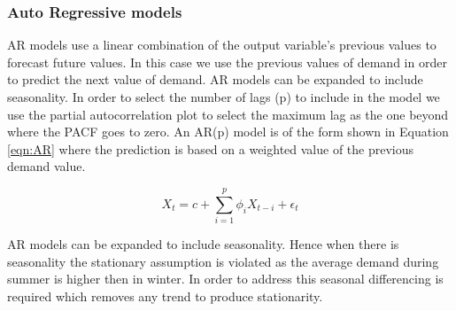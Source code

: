 \documentclass[11pt]{article}
\begin{document}
\subsubsection{Auto Regressive models}

AR models use a linear combination of the output variable's previous values to forecast future values. In this case we use the previous values of demand in order to predict the next value of demand. AR models can be expanded to include seasonality. In order to select the number of lags (p) to include in the model we use the partial autocorrelation plot to select the maximum lag as the one beyond where the PACF goes to zero. An AR(p) model is of the form shown in Equation \ref{eqn:AR} where the prediction is based on a weighted value of the previous demand value.

\begin{equation}
\label{eqn:AR}
 X_t = c + \sum_{i=1}^p  \phi_i X_{t-i} + \epsilon_t 
\end{equation}


\noindent AR models can be expanded to include seasonality. Hence when there is seasonality the stationary assumption is violated as the average demand during summer is higher then in winter. In order to address this seasonal differencing is required which removes any trend to produce stationarity.



\end{document}
